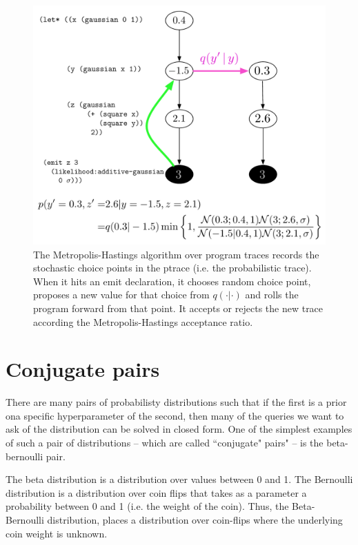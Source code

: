 \documentclass{article}
\begin{document}
\begin{figure}
\includegraphics[width=\textwidth]{figures/ptrace.pdf}
\caption{The Metropolis-Hastings algorithm over program traces records the
stochastic choice points in the ptrace (i.e. the probabilistic trace). When it
hits an emit declaration, it chooses random choice point, proposes a new
value for that choice from $q(\cdot | \cdot)$ and rolls the program forward from
that point. It accepts or rejects the new trace according the
Metropolis-Hastings acceptance ratio.} \label{fig:ptrace}
\end{figure}

\section{Conjugate pairs}
There are many pairs of probabilisty distributions such that if the first is a
prior ona  specific hyperparameter of the second, then many of the queries we
want to ask of the distribution can be solved in closed form. One of the
simplest examples of such a pair of distributions -- which are called
``conjugate" pairs" -- is the beta-bernoulli pair. 

The beta distribution is a distribution over values between 0 and 1. The
Bernoulli distribution is a distribution over coin flips that takes as a
parameter a probability between 0 and 1 (i.e. the weight of the coin). Thus,
the Beta-Bernoulli distribution, places a distribution over coin-flips where
the underlying coin weight is unknown. 
\end{document}
